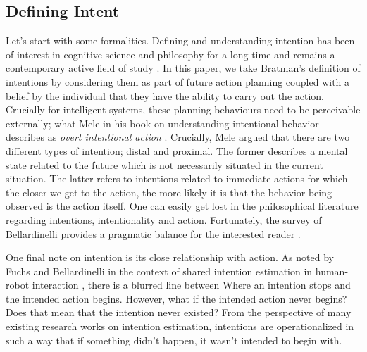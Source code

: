 \documentclass[sigconf]{acmart}
\begin{document}

\subsection{Defining Intent}
\label{sec:Def}
Let's start with some formalities. Defining and understanding intention has been of interest in cognitive science and philosophy for a long time and remains a contemporary active field of study \cite{bratman1987intention,mele1992springs,plaks2015construal,doi:10.1080/09515089.2021.1915471}. In this paper, we take Bratman's \cite{bratman1987intention} definition of intentions by considering them as part of future action planning coupled with a belief by the individual that they have the ability to carry out the action. Crucially for intelligent systems, these planning behaviours need to be perceivable externally; what Mele in his book on understanding intentional behavior describes as \emph{overt intentional action} \cite{mele1992springs}. Crucially, Mele argued that there are two different types of intention; distal and proximal. The former describes a mental state related to the future which is not necessarily situated in the current situation. The latter refers to intentions related to immediate actions for which the closer we get to the action, the more likely it is that the behavior being observed is the action itself. One can easily get lost in the philosophical literature regarding intentions, intentionality and action. Fortunately, the survey of Bellardinelli provides a pragmatic balance for the interested reader \cite{belardinelli2023gazebased}. 

One final note on intention is its close relationship with action. As noted by Fuchs and Bellardinelli in the context of shared intention estimation in human-robot interaction \cite{10.3389/fnbot.2021.647930}, there is a blurred line between Where an intention stops and the intended action begins. However, what if the intended action never begins? Does that mean that the intention never existed? From the perspective of many existing research works on intention estimation, intentions are operationalized in such a way that if something didn't happen, it wasn't intended to begin with. 
\end{document}

